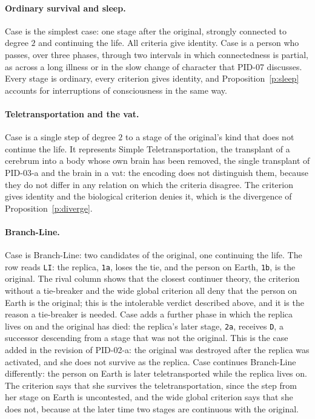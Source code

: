\documentclass{situationist-preprint}
\begin{document}
\paragraph{Ordinary survival and sleep.} Case \caseOrdinary{} is the simplest case: one stage after the original, strongly connected to degree $2$ and continuing the life. All criteria give identity. Case \caseSleepLong{} is a person who passes, over three phases, through two intervals in which connectedness is partial, as across a long illness or in the slow change of character that PID-07 discusses. Every stage is ordinary, every criterion gives identity, and Proposition~\ref{p:sleep} accounts for interruptions of consciousness in the same way.

\paragraph{Teletransportation and the vat.} Case \caseTeleport{} is a single step of degree $2$ to a stage of the original's kind that does not continue the life. It represents Simple Teletransportation, the transplant of a cerebrum into a body whose own brain has been removed, the single transplant of PID-03-a and the brain in a vat: the encoding does not distinguish them, because they do not differ in any relation on which the criteria disagree. The criterion gives identity and the biological criterion denies it, which is the divergence of Proposition~\ref{p:diverge}.

\paragraph{Branch-Line.} Case \caseBranchLine{} is Branch-Line: two candidates of the original, one continuing the life. The row reads \texttt{LI}: the replica, \texttt{1a}, loses the tie, and the person on Earth, \texttt{1b}, is the original. The rival column shows that the closest continuer theory, the criterion without a tie-breaker and the wide global criterion all deny that the person on Earth is the original; this is the intolerable verdict described above, and it is the reason a tie-breaker is needed. Case \caseBranchLineLate{} adds a further phase in which the replica lives on and the original has died: the replica's later stage, \texttt{2a}, receives \texttt{D}, a successor descending from a stage that was not the original. This is the case added in the revision of PID-02-a: the original was destroyed after the replica was activated, and she does not survive as the replica. Case \caseBranchLineThenTele{} continues Branch-Line differently: the person on Earth is later teletransported while the replica lives on. The criterion says that she survives the teletransportation, since the step from her stage on Earth is uncontested, and the wide global criterion says that she does not, because at the later time two stages are continuous with the original.
\end{document}
